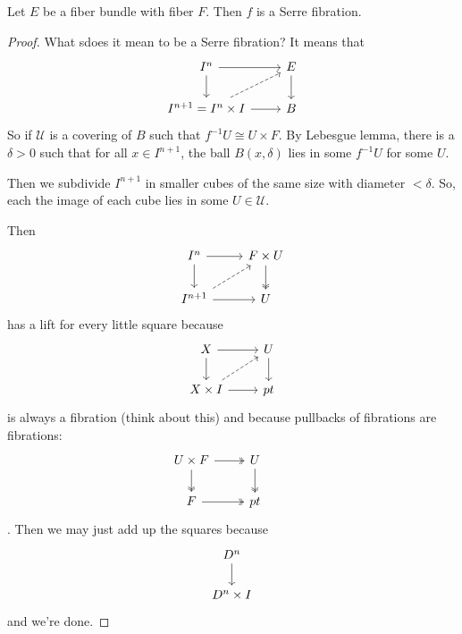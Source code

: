 \begin{prop}[Hatcher, 4.48]
	Let $E$ be a fiber bundle with fiber $F$. Then $f$ is a Serre fibration.
\end{prop}
\begin{proof}
	What sdoes it mean to be a Serre fibration? It means that
	\[\begin{tikzcd}
		I^n\arrow[r]\arrow[d]&E\arrow[d]\\
		I^{n+1}=I^n\times I\arrow[r]\arrow[ur,dashed]&B
	\end{tikzcd}\]
	So if $\mathcal{U}$ is a covering of $B$ such that $f^{-1}U\cong U\times F$. By Lebesgue lemma, there is a $\delta>0$ such that for all $x\in I^{n+1}$, the ball $B(x,\delta)$ lies in some $f^{-1}U$ for some $U$.
	
	Then we subdivide $I^{n+1}$ in smaller cubes of the same size with diameter $<\delta$. So, each the image of each cube lies in some $U\in\mathcal{U}$.
	
	Then
	\[\begin{tikzcd}
		I^n\arrow[d]\arrow[r]&F\times U\arrow[d,two heads]\\
		I^{n+1}\arrow[r]\arrow[ur,dashed]&U
	\end{tikzcd}\]
	has a lift for every little square because
	\[\begin{tikzcd}
		X\arrow[r]\arrow[d]&U\arrow[d]\\
		X\times I\arrow[r]\arrow[ur,dashed]&pt
	\end{tikzcd}\]
	is always a fibration {\color{orange}(think about this)} and because pullbacks of fibrations are fibrations:
	\[\begin{tikzcd}
		U\times F\arrow[r,two heads]\arrow[d,two heads]&U\arrow[d,two heads]&\\
		F\arrow[r,two heads]&pt
	\end{tikzcd}\].
	Then we may just add up the squares because
	\[\begin{tikzcd}
		D^n\arrow[d]\\
		D^n\times I
	\end{tikzcd}\]
	and we're done.
\end{proof}

